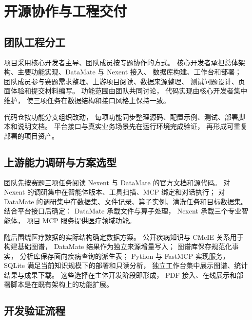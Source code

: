 \chapter{开源协作与工程交付}

\section{团队工程分工}

项目采用核心开发者主导、团队成员按专题协作的方式。
核心开发者承担总体架构、主要功能实现、DataMate 与 Nexent 接入、
数据库构建、工作台和部署；
团队成员参与赛题需求整理、上游项目阅读、数据来源整理、
测试问题设计、页面体验和提交材料编写。
功能范围由团队共同讨论，
代码实现由核心开发者集中维护，
使三项任务在数据结构和接口风格上保持一致。

代码仓按功能分支组织改动，
每项功能同步整理源码、配置示例、测试、部署脚本和说明文档。
平台接口与真实业务场景先在运行环境完成验证，
再形成可重复部署的项目资产。

\section{上游能力调研与方案选型}

团队先按赛题三项任务阅读 Nexent 与 DataMate 的官方文档和源代码。
对 Nexent 的调研集中在智能体版本、工具扫描、MCP 绑定和对话执行；
对 DataMate 的调研集中在数据集、文件记录、算子实例、清洗任务和目标数据集。
结合平台接口后确定：
DataMate 承载文件与算子处理，
Nexent 承载三个专业智能体，
项目 MCP 服务提供医疗领域功能。

随后围绕医疗数据的实际结构确定数据方案。
公开疾病知识与 CMeIE 关系用于构建基础图谱，
DataMate 结果作为独立来源增量写入；
图谱库保存规范化事实，
分析库保存面向疾病查询的派生表；
Python 与 FastMCP 实现服务，
SQLite 满足当前知识规模下的部署和只读分析，
独立工作台集中展示图谱、统计结果与成果下载。
这些选择在主体开发阶段即形成，
PDF 接入、在线展示和部署脚本是在既有架构上的功能扩展。

\section{开发验证流程}

